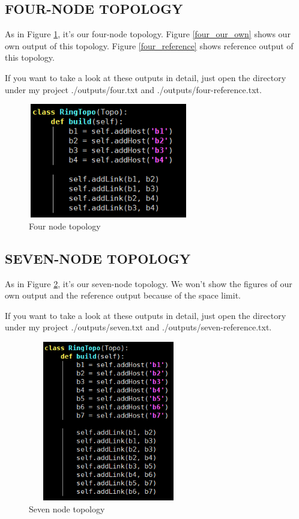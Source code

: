 \documentclass{article}
\begin{document}
\subsection{FOUR-NODE TOPOLOGY}

As in Figure \ref{four_node_topo}, it's our four-node topology. 
Figure \ref{four_our_own} shows our own output of this topology.
Figure \ref{four_reference} shows reference output of this topology.

If you want to take a look at these outputs in detail, just open the directory under my project ./outputs/four.txt and ./outputs/four-reference.txt.

\begin{figure}
	\centering
	\includegraphics[width=7cm, height=5cm]{four_node_topo.png}
	\caption{Four node topology}
	\label{four_node_topo}
\end{figure}

\subsection{SEVEN-NODE TOPOLOGY}

As in Figure \ref{seven_node_topo}, it's our seven-node topology. 
We won't show the figures of our own output and the reference output because of the space limit.

If you want to take a look at these outputs in detail, just open the directory under my project ./outputs/seven.txt and ./outputs/seven-reference.txt.

\begin{figure}
	\centering
	\includegraphics[width=7cm, height=7cm]{seven_node_topo.png}
	\caption{Seven node topology}
	\label{seven_node_topo}
\end{figure}
\end{document}
